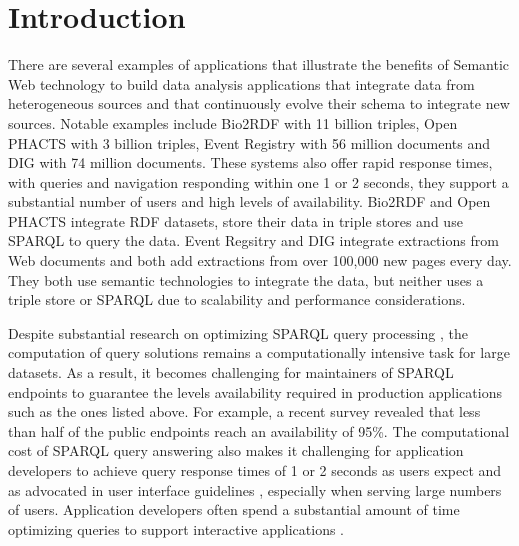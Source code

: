 \section{Introduction}
There are several examples of applications that illustrate the benefits of Semantic Web technology to build data analysis applications that integrate data from heterogeneous sources and that continuously evolve their schema to integrate new sources.
Notable examples include Bio2RDF \cite{callahan2013bio2rdf} with 11 billion triples, Open PHACTS \cite{Groth_Loizou_Gray_Goble_Harland_Pettifer_2014} with 3 billion triples, Event Registry \cite{Leban_Fortuna_Brank_Grobelnik_2014} with 56 million documents and DIG \cite{szekely2015building} with 74 million documents.
These systems also offer rapid response times, with queries and navigation responding within one 1 or 2 seconds, they support a substantial number of users and high levels of availability.
Bio2RDF and Open PHACTS integrate RDF datasets, store their data in triple stores and use SPARQL to query the data.
Event Regsitry and DIG integrate extractions from Web documents and both add extractions from over 100,000 new pages every day.
They both use semantic technologies to integrate the data, but neither uses a triple store or SPARQL due to scalability and performance considerations.

Despite substantial research on optimizing SPARQL query processing \cite{Pham2013}, the computation of query solutions remains a computationally intensive task for large datasets.
As a result, it becomes challenging for maintainers of SPARQL endpoints to guarantee the levels availability required in production applications such as the ones listed above.
For example, a recent survey \cite{buil2013sparql} revealed that less than half of the public endpoints reach an availability of 95\%.
The computational cost of SPARQL query answering also makes it challenging for application developers to achieve query response times of 1 or 2 seconds as users expect and as advocated in user interface guidelines \cite{nielsen1994usability}, especially when serving large numbers of users.
Application developers often spend a substantial amount of time optimizing queries to support interactive applications \cite{Loizou_Angles_Groth_2014}.


